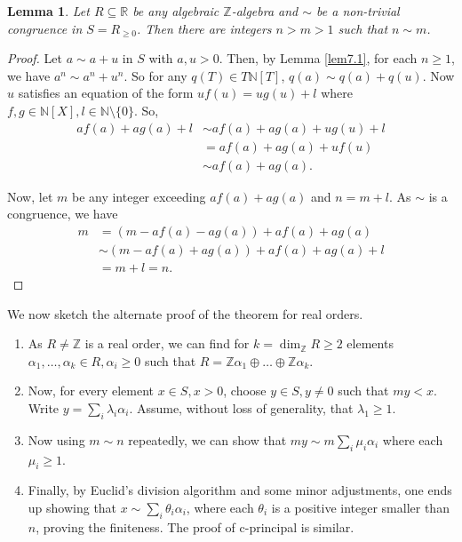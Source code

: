 \documentclass[notitlepage, 10pt]{article}
\theoremstyle{defin}
\theoremstyle{theo}
\newtheorem{lem}{Lemma}[defn]
\theoremstyle{rema}
\newcommand{\R}{\mathbb{R}}
\newcommand{\N}{\mathbb{N}}
\newcommand{\Z}{\mathbb{Z}}
\begin{document}
\begin{lem}
    \label{lem7.2}
       Let $R\subseteq \R$ be any algebraic $\Z$-algebra and $\sim$ be a non-trivial congruence in $S=R_{\geq 0}$. Then there are integers $n>m>1$ such that $n\sim m$.
\end{lem}

\begin{proof}
    Let $a \sim a+u$ in $S$ with $a,u>0$. Then, by Lemma \ref{lem7.1}, for each $n\geq 1$, we have  $a^n \sim a^n + u^n$. So for any $q(T)\in T\N[T]$, $q(a)\sim q(a)+q(u)$. Now $u$ satisfies an equation of the form $uf(u) = ug(u) + l$ where $f,g\in \N[X], l\in \N\setminus \{0\}$. So,
    \begin{align*}
        af(a)+ag(a)+l   &\sim af(a)+ag(a) +ug(u)+l \\
                        &=af(a)+ag(a) +uf(u) \\
                        &\sim af(a)+ag(a).
    \end{align*}

Now, let $m$ be any integer exceeding $af(a)+ag(a)$ and $n=m+l$. As $\sim$ is a congruence, we have 
\begin{align*}
m &= (m-af(a)-ag(a)) + af(a)+ag(a) \\
&\sim (m-af(a)+ag(a)) + af(a)+ag(a) + l \\
&= m+l =n.    
\end{align*}
\end{proof}

We now sketch the alternate proof of the theorem for real orders.

\begin{enumerate}
    \item As $R \neq \Z$ is a real order, we can find for $k=\dim_\Z R\geq 2$ elements $\alpha_1,\ldots, \alpha_k\in R, \alpha_i\geq 0$ such that $R = \Z\alpha_1 \oplus \ldots \oplus \Z\alpha_k$.
    \item Now, for every element $x\in S, x>0$, choose $y\in S, y\neq 0$ such that $my<x$. Write $y=\sum_i \lambda_i \alpha_i$. Assume, without loss of generality, that $\lambda_1\geq 1$.
    \item Now using $m\sim n$ repeatedly, we can show that $my \sim m\sum_i \mu_i \alpha_i$ where each $\mu_i\geq 1$.
    \item Finally, by Euclid's division algorithm and some minor adjustments, one ends up showing that $x\sim \sum_i \theta_i \alpha_i$, where each $\theta_i$ is a positive integer smaller than $n$, proving the finiteness. The proof of c-principal is similar.
\end{enumerate}
\end{document}
